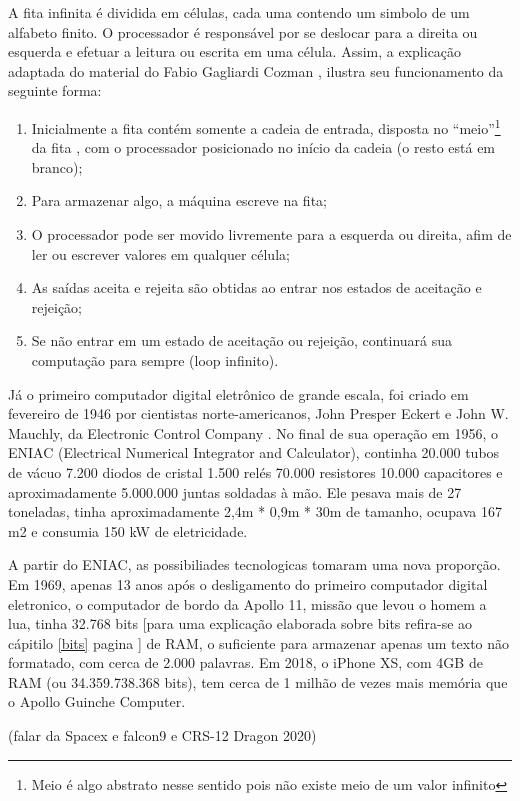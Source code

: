 A fita infinita é dividida em células, cada uma contendo um simbolo de um alfabeto finito. O processador é responsável por se deslocar para a direita ou esquerda e efetuar a leitura ou escrita em uma célula. Assim, a explicação adaptada do material do Fabio Gagliardi Cozman \cite{7}, ilustra seu funcionamento da seguinte forma:
\begin{enumerate}
  \item Inicialmente a fita contém somente a cadeia de entrada, disposta no “meio”\footnote{Meio é algo abstrato nesse sentido pois não existe meio de um valor infinito} da fita , com o processador posicionado no início da cadeia (o resto está em branco);
  \item Para armazenar algo, a máquina escreve na fita;
  \item O processador pode ser movido livremente para a esquerda ou direita, afim de ler ou escrever valores em qualquer célula;
  \item As saídas aceita e rejeita são obtidas ao entrar nos estados de aceitação e rejeição;
  \item Se não entrar em um estado de aceitação ou rejeição, continuará sua computação para sempre (loop infinito).
\end{enumerate}

Já o primeiro computador digital eletrônico de grande escala, foi criado em fevereiro de 1946 por cientistas norte-americanos, John Presper Eckert e John W. Mauchly, da Electronic Control Company . No final de sua operação em 1956, o ENIAC (Electrical Numerical Integrator and Calculator), continha 20.000 tubos de vácuo 7.200 diodos de cristal 1.500 relés 70.000 resistores 10.000 capacitores e aproximadamente 5.000.000 juntas soldadas à mão. Ele pesava mais de 27 toneladas, tinha aproximadamente 2,4m * 0,9m * 30m de tamanho, ocupava 167 m2 e consumia 150 kW de eletricidade. \cite{2}

A partir do ENIAC, as possibiliades tecnologicas tomaram uma nova proporção. Em 1969, apenas 13 anos após o desligamento do primeiro computador digital eletronico, o computador de bordo da Apollo 11, missão que levou o homem a lua, tinha 32.768 bits [para uma explicação elaborada sobre bits refira-se ao cápitilo \ref{bits} pagina \pageref{bits}] de RAM, o suficiente para armazenar apenas um texto não formatado, com cerca de 2.000 palavras. Em 2018, o iPhone XS, com 4GB de RAM (ou 34.359.738.368 bits), tem cerca de 1 milhão de vezes mais memória que o Apollo Guinche Computer. \cite{5}

(falar da Spacex e falcon9 e CRS-12 Dragon 2020)

